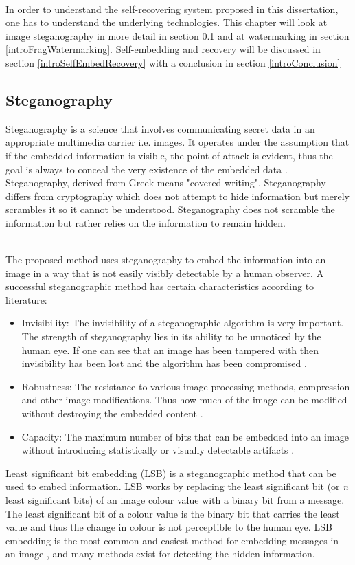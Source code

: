 \documentclass[12pt]{article}
\begin{document}
\hspace{0pt} \\
In order to understand the self-recovering system proposed in this dissertation, one has to understand the underlying technologies.  This chapter will look at image steganography in more detail in section \ref{introSteganography} and at watermarking in section \ref{introFragWatermarking}. Self-embedding and recovery will be discussed in section \ref{introSelfEmbedRecovery} with a conclusion in section \ref{introConclusion}

\subsection{Steganography}
\label{introSteganography}
Steganography is a science that involves communicating secret data in an appropriate multimedia carrier i.e. images. It operates under the assumption that if the embedded information is visible, the point of attack is evident, thus the goal is always to conceal the very existence of the embedded data \cite{cheddad2010digital}.
Steganography, derived from Greek means "covered writing".
Steganography differs from cryptography which does not attempt to hide information but merely scrambles it so it cannot be understood.
Steganography does not scramble the information but rather relies on the information to remain hidden.

\hspace{0pt} \\
The proposed method uses steganography to embed the information into an image in a way that is not easily visibly detectable by a human observer.
A successful steganographic method has certain characteristics according to literature:
\begin{itemize}
	\item Invisibility: The invisibility of a steganographic algorithm is very important. The strength of steganography lies in its ability to be unnoticed by the human eye. If one can see that an image has been tampered with then invisibility has been lost and the algorithm has been compromised \cite{morkel2005overview}.
	\item Robustness: The resistance to various image processing methods, compression and other image modifications. Thus how much of the image can be modified without destroying the embedded content \cite{cheddad2010digital}.
	\item Capacity: The maximum number of bits that can be embedded into an image without introducing statistically or visually detectable artifacts \cite{fridrich2009steganography}.
\end{itemize}
Least significant bit embedding (LSB) is a steganographic method that can be used to embed information. 
LSB works by replacing the least significant bit (or \textit{n} least significant bits) of an image colour value with a binary bit from a message. The least significant bit of a colour value is the binary bit that carries the least value and thus the change in colour is not perceptible to the human eye.
LSB embedding is the most common and easiest method for embedding messages in an image \cite{lee2000high}, and many methods exist for detecting the hidden information. 
\end{document}
